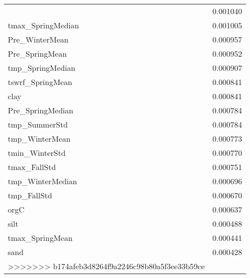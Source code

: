 \begin{tabular}{lr}
\begin{tabular}{rrrrr}
tmin_SpringMedian & 0.001040 \\
tmax_SpringMedian & 0.001005 \\
Pre_WinterMean & 0.000957 \\
Pre_SpringMean & 0.000952 \\
tmp_SpringMedian & 0.000907 \\
tswrf_SpringMean & 0.000841 \\
clay & 0.000841 \\
Pre_SpringMedian & 0.000784 \\
tmp_SummerStd & 0.000784 \\
tmp_WinterMean & 0.000773 \\
tmin_WinterStd & 0.000770 \\
tmax_FallStd & 0.000751 \\
tmp_WinterMedian & 0.000696 \\
tmp_FallStd & 0.000670 \\
orgC & 0.000637 \\
silt & 0.000488 \\
tmax_SpringMean & 0.000441 \\
sand & 0.000428 \\
>>>>>>> b174afeb3d8264f9a2246c98b80a5f3ee33b59ce
\bottomrule
\end{tabular}
